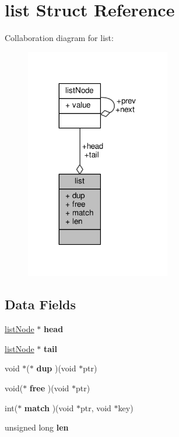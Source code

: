 \hypertarget{structlist}{}\section{list Struct Reference}
\label{structlist}


Collaboration diagram for list\+:\nopagebreak
\begin{figure}[H]
\begin{center}
\leavevmode
\includegraphics[width=179pt]{structlist__coll__graph}
\end{center}
\end{figure}
\subsection*{Data Fields}
\begin{DoxyCompactItemize}
\item 
\mbox{\label{structlist_a231e615cc831876b01a16f23ee4bb320}} 
\hyperlink{structlistNode}{list\+Node} $\ast$ {\bfseries head}
\item 
\mbox{\label{structlist_ad53539b1744468c6e2c231061bb9f0b1}} 
\hyperlink{structlistNode}{list\+Node} $\ast$ {\bfseries tail}
\item 
\mbox{\label{structlist_afeac9aa971ed948ef69e28a56ec61e90}} 
void $\ast$($\ast$ {\bfseries dup} )(void $\ast$ptr)
\item 
\mbox{\label{structlist_a95eb3d73419c957bb4d73be3a36b99d9}} 
void($\ast$ {\bfseries free} )(void $\ast$ptr)
\item 
\mbox{\label{structlist_a315ac9f80c56bf005ec81fd9559a87de}} 
int($\ast$ {\bfseries match} )(void $\ast$ptr, void $\ast$key)
\item 
\mbox{\label{structlist_a6270c3c257d9f1f35f29a59e4803ea9b}} 
unsigned long {\bfseries len}
\end{DoxyCompactItemize}


